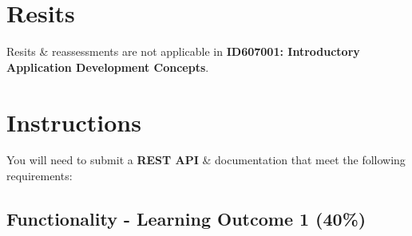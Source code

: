 \documentclass{article}
\begin{document}
\section*{Resits}
Resits \& reassessments are not applicable in \textbf{ID607001: Introductory Application Development Concepts}.

\newpage

\section*{Instructions}
You will need to submit a \textbf{REST API} \& documentation that meet the following requirements:

\subsection*{Functionality - Learning Outcome 1 (40\%)}
\end{document}
